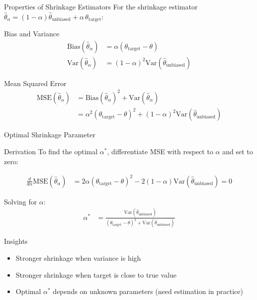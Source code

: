 \documentclass{beamer}
\begin{document}
\begin{frame}{Properties of Shrinkage Estimators}
  For the shrinkage estimator $\hat{\theta}_{\alpha} = (1-\alpha) \hat{\theta}_{\text{unbiased}} + \alpha \, \theta_{\text{target}}$:
  
  \begin{block}{Bias and Variance}
    \begin{align*}
    \text{Bias}(\hat{\theta}_{\alpha}) &= \alpha(\theta_{\text{target}} - \theta) \\
    \text{Var}(\hat{\theta}_{\alpha}) &= (1-\alpha)^2 \text{Var}(\hat{\theta}_{\text{unbiased}})
    \end{align*}
  \end{block}
  
  \begin{block}{Mean Squared Error}
    \begin{align*}
    \text{MSE}(\hat{\theta}_{\alpha}) &= \text{Bias}(\hat{\theta}_{\alpha})^2 + \text{Var}(\hat{\theta}_{\alpha}) \\
    &= \alpha^2(\theta_{\text{target}} - \theta)^2 + (1-\alpha)^2 \text{Var}(\hat{\theta}_{\text{unbiased}})
    \end{align*}
  \end{block}
\end{frame}

\begin{frame}{Optimal Shrinkage Parameter}
  \begin{block}{Derivation}
    To find the optimal $\alpha^*$, differentiate MSE with respect to $\alpha$ and set to zero:
    
    \begin{align*}
    \frac{d}{d\alpha} \text{MSE}(\hat{\theta}_{\alpha}) &= 2\alpha(\theta_{\text{target}} - \theta)^2 - 2(1-\alpha) \text{Var}(\hat{\theta}_{\text{unbiased}}) = 0
    \end{align*}
    
    Solving for $\alpha$:
    \begin{align*}
    \alpha^* &= \frac{\text{Var}(\hat{\theta}_{\text{unbiased}})}{(\theta_{\text{target}} - \theta)^2 + \text{Var}(\hat{\theta}_{\text{unbiased}})}
    \end{align*}
  \end{block}
  
  \begin{block}{Insights}
    \begin{itemize}
      \item Stronger shrinkage when variance is high
      \item Stronger shrinkage when target is close to true value
      \item Optimal $\alpha^*$ depends on unknown parameters (need estimation in practice)
    \end{itemize}
  \end{block}
\end{frame}
\end{document}
